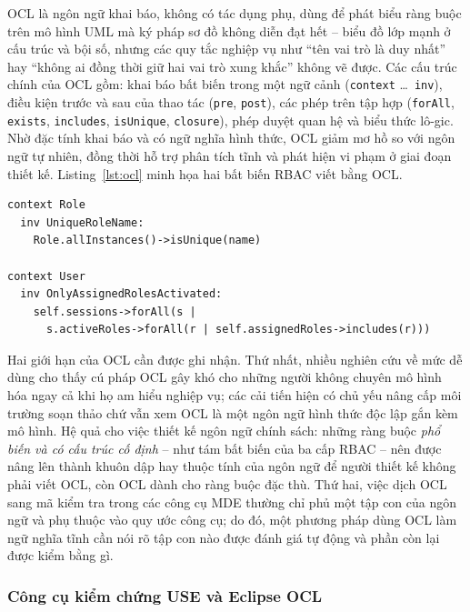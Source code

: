 OCL \cite{omg2014ocl} là ngôn ngữ khai báo, không có tác dụng phụ, dùng để phát biểu ràng buộc trên mô hình UML mà ký pháp sơ đồ không diễn đạt hết -- biểu đồ lớp mạnh ở cấu trúc và bội số, nhưng các quy tắc nghiệp vụ như ``tên vai trò là duy nhất'' hay ``không ai đồng thời giữ hai vai trò xung khắc'' không vẽ được. Các cấu trúc chính của OCL gồm: khai báo bất biến trong một ngữ cảnh (\texttt{context} \ldots\ \texttt{inv}), điều kiện trước và sau của thao tác (\texttt{pre}, \texttt{post}), các phép trên tập hợp (\texttt{forAll}, \texttt{exists}, \texttt{includes}, \texttt{isUnique}, \texttt{closure}), phép duyệt quan hệ và biểu thức lô-gic. Nhờ đặc tính khai báo và có ngữ nghĩa hình thức, OCL giảm mơ hồ so với ngôn ngữ tự nhiên, đồng thời hỗ trợ phân tích tĩnh và phát hiện vi phạm ở giai đoạn thiết kế. Listing~\ref{lst:ocl} minh họa hai bất biến RBAC viết bằng OCL.

\begin{lstlisting}[language=OCL,caption={Hai bất biến RBAC viết bằng OCL},label={lst:ocl}]
context Role
  inv UniqueRoleName:
    Role.allInstances()->isUnique(name)

context User
  inv OnlyAssignedRolesActivated:
    self.sessions->forAll(s |
      s.activeRoles->forAll(r | self.assignedRoles->includes(r)))
\end{lstlisting}

Hai giới hạn của OCL cần được ghi nhận. Thứ nhất, nhiều nghiên cứu về mức dễ dùng cho thấy cú pháp OCL gây khó cho những người không chuyên mô hình hóa ngay cả khi họ am hiểu nghiệp vụ; các cải tiến hiện có chủ yếu nâng cấp môi trường soạn thảo chứ vẫn xem OCL là một ngôn ngữ hình thức độc lập gắn kèm mô hình. Hệ quả cho việc thiết kế ngôn ngữ chính sách: những ràng buộc \emph{phổ biến và có cấu trúc cố định} -- như tám bất biến của ba cấp RBAC -- nên được nâng lên thành khuôn dập hay thuộc tính của ngôn ngữ để người thiết kế không phải viết OCL, còn OCL dành cho ràng buộc đặc thù. Thứ hai, việc dịch OCL sang mã kiểm tra trong các công cụ MDE thường chỉ phủ một tập con của ngôn ngữ và phụ thuộc vào quy ước công cụ; do đó, một phương pháp dùng OCL làm ngữ nghĩa tĩnh cần nói rõ tập con nào được đánh giá tự động và phần còn lại được kiểm bằng gì.

\subsubsection{Công cụ kiểm chứng USE và Eclipse OCL}

